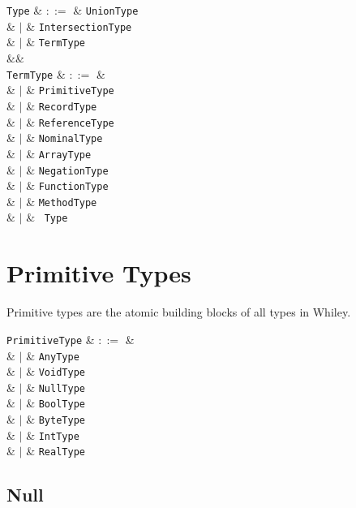 \begin{syntax}
  \verb+Type+ & $::=$ & \verb+UnionType+ \\
              & $|$ & \verb+IntersectionType+ \\
              & $|$ & \verb+TermType+ \\
              &&\\
  \verb+TermType+ & $::=$ & \\
  & $|$ & \verb+PrimitiveType+ \\
  & $|$ & \verb+RecordType+ \\
  & $|$ & \verb+ReferenceType+ \\
  & $|$ & \verb+NominalType+ \\
  & $|$ & \verb+ArrayType+ \\
  & $|$ & \verb+NegationType+ \\
  & $|$ & \verb+FunctionType+ \\
  & $|$ & \verb+MethodType+ \\
  & $|$ & \token{(}\ \verb+Type+\ \token{)}\\
\end{syntax}

\section{Primitive Types}
\label{c_types_primitive_types}

Primitive types are the atomic building blocks of all types in Whiley.  

\begin{syntax}
  \verb+PrimitiveType+ & $::=$ & \\
  & $|$ & \verb+AnyType+ \\
  & $|$ & \verb+VoidType+ \\
  & $|$ & \verb+NullType+ \\
  & $|$ & \verb+BoolType+ \\
  & $|$ & \verb+ByteType+ \\
  & $|$ & \verb+IntType+ \\
  & $|$ & \verb+RealType+ \\
\end{syntax}


\subsection{Null}
\label{c_types_null}

